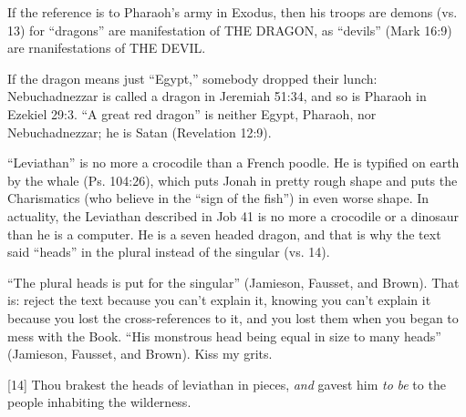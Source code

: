 {\begin{compactenum}
\item If the reference is to Pharaoh’s army in Exodus, then his troops are demons (vs. 13) for “dragons” are manifestation of THE DRAGON, as “devils” (Mark 16:9) are rnanifestations of THE DEVIL.
\item If the dragon means just “Egypt,” somebody dropped their lunch: Nebuchadnezzar is called a dragon in Jeremiah 51:34, and so is Pharaoh in Ezekiel 29:3. ``A great red dragon'' is neither Egypt, Pharaoh, nor Nebuchadnezzar; he is Satan (Revelation 12:9).
\item “Leviathan” is no more a crocodile than a French poodle. He is typified on earth by the whale (Ps. 104:26), which puts Jonah in pretty rough shape and puts the Charismatics (who believe in the “sign of the fish”) in even worse shape. In actuality, the Leviathan described in Job 41 is no more a crocodile or a dinosaur than he is a computer. He is a seven headed dragon, and that is why the text said “heads” in the plural instead of the singular (vs. 14).
\end{compactenum}
“The plural heads is put for the singular” (Jamieson, Fausset, and Brown). That is: reject the text because you can’t explain it, knowing you can’t explain it because you lost the cross-references to it, and you lost them when you began to mess with the Book. “His monstrous head being equal in size to many heads” (Jamieson, Fausset, and Brown). Kiss my grits. \cite{Ruckman1992Psalms} }
[14] \textcolor[rgb]{0.00,0.00,1.00}{Thou brakest the heads of leviathan in pieces, \emph{and} gavest him \emph{to} \emph{be}  to the people inhabiting the wilderness.}
